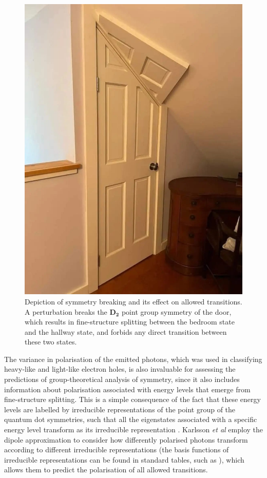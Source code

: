 \documentclass[12pt]{article}
\begin{document}
\begin{figure}
\begin{center}
\includegraphics[scale=0.15]{figures/symmetry_breaking_door}
\end{center}
\caption{Depiction of symmetry breaking and its effect on allowed transitions. A perturbation breaks the $\mathbf{D_2}$ point group symmetry of the door, which results in fine-structure splitting between the bedroom state and the hallway state, and forbids any direct transition between these two states.}
\end{figure}

The variance in polarisation of the emitted photons, which was used in classifying heavy-like and light-like electron holes, is also invaluable for assessing the predictions of group-theoretical analysis of symmetry, since it also includes information about polarisation associated with energy levels that emerge from fine-structure splitting. This is a simple consequence of the fact that these energy levels are labelled by irreducible representations of the point group of the quantum dot symmetries, such that all the eigenstates associated with a specific energy level transform as its irreducible representation \cite[Ch. 5]{dresselhaus}. Karlsson \textit{et al} employ the dipole approximation to consider how differently polarised photons transform according to different irreducible representations (the basis functions of irreducible representations can be found in standard tables, such as \cite{altmann}), which allows them to predict the polarisation of all allowed transitions.
\end{document}
